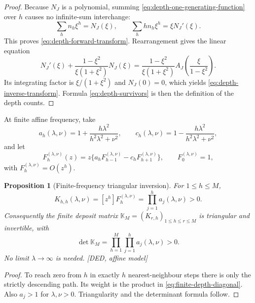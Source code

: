 \documentclass[11pt]{amsart}
\numberwithin{equation}{section}
\theoremstyle{plain}
\newtheorem{proposition}[theorem]{Proposition}
\theoremstyle{definition}
\theoremstyle{remark}
\begin{document}
\begin{proof}
Because $N_J$ is a polynomial, summing \eqref{eq:depth-one-generating-function}
over $h$ causes no infinite-sum interchange:
\begin{equation}
 \sum_hn_h\xi^h=N_J(\xi),\qquad
 \sum_hh n_h\xi^h=\xi N_J'(\xi).
\end{equation}
This proves \eqref{eq:depth-forward-transform}.  Rearrangement gives the
linear equation
\begin{equation}
 N_J'(\xi)+\frac{1-\xi^2}{\xi(1+\xi^2)}N_J(\xi)
 =\frac{1-\xi^2}{\xi(1+\xi^2)}
 A_J\!\left(\frac{\xi}{1-\xi^2}\right).
\end{equation}
Its integrating factor is $\xi/(1+\xi^2)$ and $N_J(0)=0$, which yields
\eqref{eq:depth-inverse-transform}.  Formula \eqref{eq:depth-survivors} is
then the definition of the depth counts.
\end{proof}

At finite affine frequency, take
\begin{equation}
 a_h(\lambda,\nu)=1+\frac{h\lambda^2}{h^2\lambda^2+\nu^2},
 \qquad
 c_h(\lambda,\nu)=1-\frac{h\lambda^2}{h^2\lambda^2+\nu^2},
\label{eq:finite-affine-weights}
\end{equation}
and let
\begin{equation}
 F_h^{(\lambda,\nu)}(z)
 =z\{a_hF_{h-1}^{(\lambda,\nu)}-c_hF_{h+1}^{(\lambda,\nu)}\},
 \qquad F_0^{(\lambda,\nu)}=1,
\label{eq:finite-affine-recurrence}
\end{equation}
with $F_h^{(\lambda,\nu)}=O(z^h)$.

\begin{proposition}[Finite-frequency triangular inversion]
\label{prop:finite-frequency-depth-inversion}
For $1\le h\le M$,
\begin{equation}
 K_{h,h}(\lambda,\nu)=[z^h]F_h^{(\lambda,\nu)}
 =\prod_{j=1}^h a_j(\lambda,\nu)>0.
\label{eq:finite-depth-diagonal}
\end{equation}
Consequently the finite deposit matrix
$\mathbb K_M=(K_{r,h})_{1\le h\le r\le M}$ is triangular and invertible,
with
\begin{equation}
 \det\mathbb K_M
 =\prod_{h=1}^M\prod_{j=1}^h a_j(\lambda,\nu)>0.
\label{eq:finite-depth-determinant}
\end{equation}
No limit $\lambda\to\infty$ is needed.  \textup{[DED, affine model]}
\end{proposition}

\begin{proof}
To reach zero from $h$ in exactly $h$ nearest-neighbour steps there is only
the strictly descending path.  Its weight is the product in
\eqref{eq:finite-depth-diagonal}.  Also $a_j>1$ for $\lambda,\nu>0$.
Triangularity and the determinant formula follow.
\end{proof}
\end{document}
